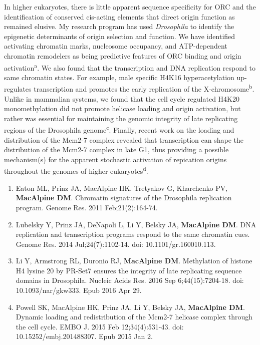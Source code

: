 \documentclass{nihbiosketch}
\newcommand\dros{{\itshape Drosophila}\xspace}
\begin{document}
\begin{enumerate}
In higher eukaryotes, there is little apparent sequence specificity for ORC and the identification of conserved cis-acting elements that direct origin function as remained elusive.  My research program has used \dros to identify the epigenetic determinants of origin selection and function. We have identified activating chromatin marks, nucleosome occupancy, and ATP-dependent chromatin remodelers as being predictive features of ORC binding and origin activation\textsuperscript{a}. We also found that the transcription and DNA replication respond to same chromatin states.  For example, male specific H4K16 hyperacetylation up-regulates transcription and promotes the early replication of the X-chromosome\textsuperscript{b}.  Unlike in mammalian systems, we found that the cell cycle regulated H4K20 monomethylation did not promote helicase loading and origin activation, but rather was essential for maintaining the genomic integrity of late replicating regions of the Drosophila genome\textsuperscript{c}.  Finally, recent work on the loading and distribution of the Mcm2-7 complex revealed that transcription can shape the distribution of the Mcm2-7 complex in late G1, thus providing a possible mechanism(s) for the apparent stochastic activation of repication origins throughout the genomes of higher eukaryotes\textsuperscript{d}.



\begin{enumerate}
\setlength\itemsep{0.35em}

\item Eaton ML, Prinz JA, MacAlpine HK, Tretyakov G, Kharchenko PV, \textbf{MacAlpine DM}. Chromatin signatures of the Drosophila replication program. Genome Res. 2011 Feb;21(2):164-74. 

\item Lubelsky Y, Prinz JA, DeNapoli L, Li Y, Belsky JA, \textbf{MacAlpine DM}. DNA
replication and transcription programs respond to the same chromatin cues. Genome Res. 2014 Jul;24(7):1102-14. doi: 10.1101/gr.160010.113. 

\item Li Y, Armstrong RL, Duronio RJ, \textbf{MacAlpine DM}. Methylation of histone H4 lysine 20 by PR-Set7 ensures the integrity of late replicating sequence domains in Drosophila. Nucleic Acids Res. 2016 Sep 6;44(15):7204-18. doi: 10.1093/nar/gkw333. Epub 2016 Apr 29. 

\item Powell SK, MacAlpine HK, Prinz JA, Li Y, Belsky JA, \textbf{MacAlpine DM}. Dynamic
loading and redistribution of the Mcm2-7 helicase complex through the cell cycle. EMBO J. 2015 Feb 12;34(4):531-43. doi: 10.15252/embj.201488307. Epub 2015 Jan 2. 



\end{enumerate}
\end{enumerate}
\end{document}
